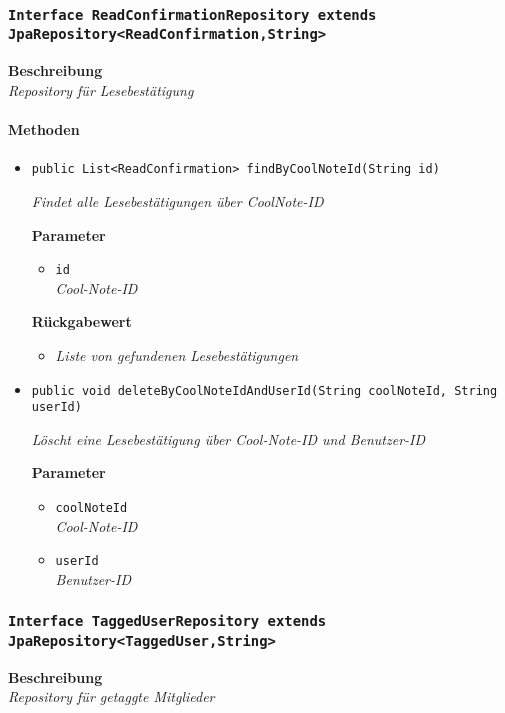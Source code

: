      
     \subsubsection{\texttt{Interface ReadConfirmationRepository extends JpaRepository<ReadConfirmation,String>}}
     \textbf{Beschreibung} \\
     \textit{Repository für Lesebestätigung}
     \paragraph*{Methoden}
     \begin{itemize}
     	\item{\texttt{public List<ReadConfirmation> findByCoolNoteId(String id)}}
     	
     	\textit{Findet alle Lesebestätigungen über CoolNote-ID}
     	
     	\textbf{Parameter}
     	\begin{itemize}
     		\item\texttt{id}\\
     		\textit{Cool-Note-ID}
     	\end{itemize}
     	
     	\textbf{Rückgabewert}
     	\begin{itemize}
     		\item\textit{Liste von gefundenen Lesebestätigungen}
     	\end{itemize}
     
     \item{\texttt{public void deleteByCoolNoteIdAndUserId(String coolNoteId, String userId)}}
     	
     	\textit{Löscht eine Lesebestätigung über Cool-Note-ID und Benutzer-ID}
     	
     	\textbf{Parameter}
     	\begin{itemize}
     		\item\texttt{coolNoteId}\\
     		\textit{Cool-Note-ID}
     		\item\texttt{userId}\\
     		\textit{Benutzer-ID}
     	\end{itemize}
     \end{itemize}
     
     \subsubsection{\texttt{Interface TaggedUserRepository extends JpaRepository<TaggedUser,String>}}
     \textbf{Beschreibung} \\
     \textit{Repository für getaggte Mitglieder}

